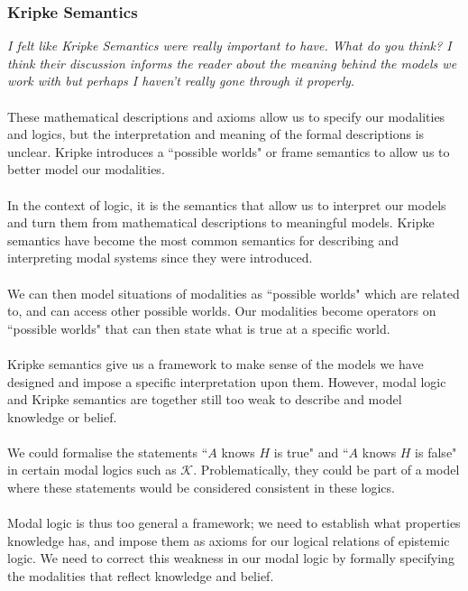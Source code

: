 \documentclass[12pt, a4paper, twoside]{article}
\begin{document}
\subsubsection{Kripke Semantics}\label{epistemic_kripke}
{\em I felt like Kripke Semantics were really important to have.
What do you think?
I think their discussion informs the reader about the meaning behind the models
we work with but perhaps I haven't really gone through it properly.}\\
\\
These mathematical descriptions and axioms allow us to specify our modalities
and logics, but the interpretation and meaning of the formal descriptions is
unclear.
Kripke introduces a ``possible worlds" or frame semantics to allow us to better
model our modalities. \citep{blackburn2002modal} \\
\\
In the context of logic, it is the semantics that allow us to interpret our
models and turn them from mathematical descriptions to meaningful models.
Kripke semantics have become the most common semantics for describing and
interpreting modal systems since they were introduced.\\
\\
We can then model situations of modalities as ``possible worlds" which are
related to, and can access other possible worlds.
Our modalities become operators on ``possible worlds" that can then state what
is true at a specific world.\\
\\
Kripke semantics give us a framework to make sense of the models we have
designed and impose a specific interpretation upon them.
However, modal logic and Kripke semantics are together still too weak to
describe and model knowledge or belief.\\
\\
We could formalise the statements ``$A$ knows $H$ is true" and ``$A$ knows $H$
is false" in certain modal logics such as $\mathcal{K}$.
Problematically, they could be part of a model where these statements would be
considered consistent in these logics.\\
\\
Modal logic is thus too general a framework; we need to establish what
properties knowledge has, and impose them as axioms for our logical relations of
epistemic logic.
We need to correct this weakness in our modal logic by formally specifying the
modalities that reflect knowledge and belief.
\end{document}

